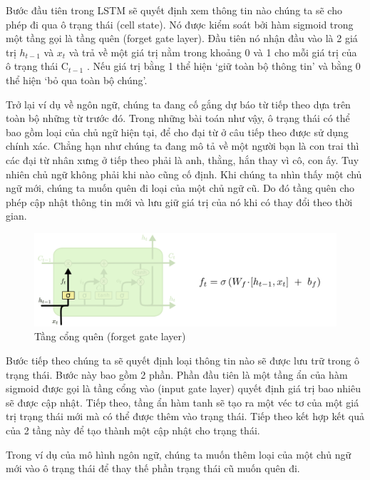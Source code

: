 
\indent Bước đầu tiên trong LSTM sẽ quyết định xem thông tin nào chúng ta sẽ cho phép đi qua ô trạng thái (cell state). Nó được kiểm soát bởi hàm sigmoid trong một tầng gọi là tầng quên (forget gate layer). Đầu tiên nó nhận đầu vào là 2 giá trị \( h_{t-1} \)
 và \( x_{t} \)
 và trả về một giá trị nằm trong khoảng 0 và 1 cho mỗi giá trị của ô trạng thái \( \text{C}_{t-1} \)
. Nếu giá trị bằng 1 thể hiện ‘giữ toàn bộ thông tin’ và bằng 0 thể hiện ‘bỏ qua toàn bộ chúng’.

\indent Trở lại ví dụ về ngôn ngữ, chúng ta đang cố gắng dự báo từ tiếp theo dựa trên toàn bộ những từ trước đó. Trong những bài toán như vậy, ô trạng thái có thể bao gồm loại của chủ ngữ hiện tại, để cho đại từ ở câu tiếp theo được sử dụng chính xác. Chẳng hạn như chúng ta đang mô tả về một người bạn là con trai thì các đại từ nhân xưng ở tiếp theo phải là anh, thằng, hắn thay vì cô, con ấy. Tuy nhiên chủ ngữ không phải khi nào cũng cố định. Khi chúng ta nhìn thấy một chủ ngữ mới, chúng ta muốn quên đi loại của một chủ ngữ cũ. Do đó tầng quên cho phép cập nhật thông tin mới và lưu giữ giá trị của nó khi có thay đổi theo thời gian.

\begin{figure}[H]
    \centering
    \includegraphics[width=14cm]{Images/Architecture/LSTM3-focus-f.png}
\caption{Tầng cổng quên (forget gate layer)}
\end{figure}

\indent Bước tiếp theo chúng ta sẽ quyết định loại thông tin nào sẽ được lưu trữ trong ô trạng thái. Bước này bao gồm 2 phần. Phần đầu tiên là một tầng ẩn của hàm sigmoid được gọi là tầng cổng vào (input gate layer) quyết định giá trị bao nhiêu sẽ được cập nhật. Tiếp theo, tầng ẩn hàm tanh sẽ tạo ra một véc tơ của một giá trị trạng thái mới 
 mà có thể được thêm vào trạng thái. Tiếp theo kết hợp kết quả của 2 tầng này để tạo thành một cập nhật cho trạng thái.

 \indent Trong ví dụ của mô hình ngôn ngữ, chúng ta muốn thêm loại của một chủ ngữ mới vào ô trạng thái để thay thế phần trạng thái cũ muốn quên đi.

